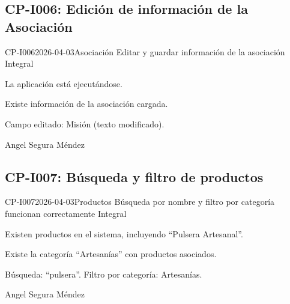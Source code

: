 \subsection{CP-I006: Edición de información de la Asociación}
\def\cpPasos{%
  \item Navegar a ``Asociación''.
  \item Verificar que hay información cargada.
  \item Editar el campo de Misión.
  \item Guardar los cambios.
  \item Verificar que el cambio persiste.}
\def\cpResultadoE{%
  \item La información se actualiza y persiste correctamente.}
\def\cpResultadoO{Había información cargada en el módulo. El cambio en la misión
  se guardó correctamente.}
\casoprueba
  {CP-I006}{2026-04-03}{Asociación}
  {Editar y guardar información de la asociación}
  {Integral}{\estadoAprobado}
  {\item La aplicación está ejecutándose.
   \item Existe información de la asociación cargada.}
  {\item Campo editado: Misión (texto modificado).}
  {Angel Segura Méndez}

\subsection{CP-I007: Búsqueda y filtro de productos}
\def\cpPasos{%
  \item Navegar a ``Productos''.
  \item Buscar por texto ``pulsera''.
  \item Verificar resultados.
  \item Filtrar por categoría ``Artesanías''.
  \item Verificar resultados del filtro.}
\def\cpResultadoE{%
  \item La búsqueda y el filtro muestran solo los productos que coinciden.}
\def\cpResultadoO{Tanto la búsqueda por nombre ``pulsera'' como el filtro por
  categoría ``Artesanías'' funcionaron correctamente, mostrando solo los productos
  correspondientes.}
\casoprueba
  {CP-I007}{2026-04-03}{Productos}
  {Búsqueda por nombre y filtro por categoría funcionan correctamente}
  {Integral}{\estadoAprobado}
  {\item Existen productos en el sistema, incluyendo ``Pulsera Artesanal''.
   \item Existe la categoría ``Artesanías'' con productos asociados.}
  {\item Búsqueda: ``pulsera''. Filtro por categoría: Artesanías.}
  {Angel Segura Méndez}


